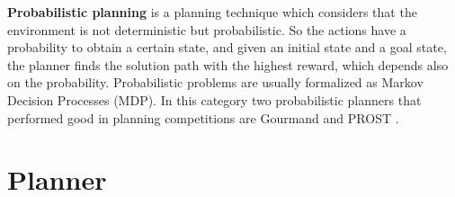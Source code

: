 \textbf{Probabilistic planning} is a planning technique which considers that the environment is not deterministic but probabilistic. So the actions have a probability to obtain a certain state, and given an initial state and a goal state, the planner finds the solution path with the highest reward, which depends also on the probability. Probabilistic problems are usually formalized as Markov Decision Processes (MDP).
In this category two probabilistic planners that performed good in planning competitions are Gourmand \cite{Gourmand} and PROST \cite{PROST}.

\section{Planner}

